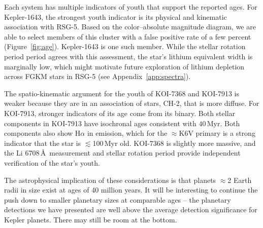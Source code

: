 \documentclass[12pt,twocolumn]{aastex63}
\begin{document}
Each system has multiple indicators of youth that support the reported
ages.  For Kepler-1643, the strongest youth indicator is its physical
and kinematic association with RSG-5.  Based on the color--absolute
magnitude diagram, we are able to select members of this cluster with
a false positive rate of a few percent (Figure~\ref{fig:age}).
Kepler-1643 is one such member.  While the stellar rotation period
period agrees with this assessment, the star's lithium equivalent
width is marginally low, which might motivate future exploration of
lithium depletion across FGKM stars in RSG-5 (see
Appendix~\ref{app:spectra}).

The spatio-kinematic argument for the youth of KOI-7368 and KOI-7913
is weaker because they are in an association of stars, CH-2, that is
more diffuse.  For KOI-7913, stronger indicators of its age come from
its binary.  Both stellar components in KOI-7913 have isochronal ages
consistent with $40$\,Myr.  Both components also show H$\alpha$ in
emission, which for the $\approx$K6V primary is a strong indicator
that the star is $\lesssim$100$\,$Myr old.  KOI-7368 is slightly more
massive, and the Li 6708\,\AA\ measurement and stellar rotation period
provide independent verification of the star's youth.

The astrophysical implication of these considerations is that planets
$\approx$2 Earth radii in size exist at ages of 40 million years.  It
will be interesting to continue the push down to smaller planetary
sizes at comparable ages -- the planetary detections we have presented
are well above the average detection significance for Kepler planets.
There may still be room at the bottom.



\end{document}
